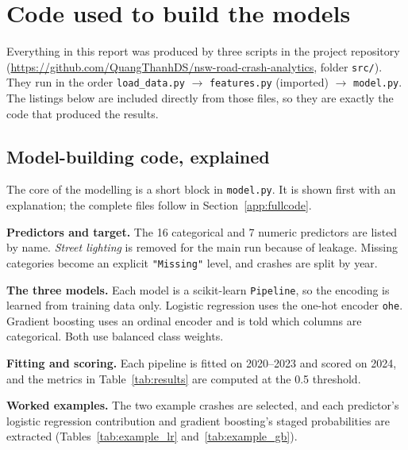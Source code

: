 \documentclass[11pt,a4paper]{article}
\begin{document}
\newpage
\section{Code used to build the models}
\label{app:code}
Everything in this report was produced by three scripts in the project repository
(\url{https://github.com/QuangThanhDS/nsw-road-crash-analytics}, folder \texttt{src/}). They run in the order
\texttt{load\_data.py} $\rightarrow$ \texttt{features.py} (imported) $\rightarrow$ \texttt{model.py}. The listings below are
included directly from those files, so they are exactly the code that produced the results.

\subsection{Model-building code, explained}
The core of the modelling is a short block in \texttt{model.py}. It is shown first with an explanation; the complete
files follow in Section~\ref{app:fullcode}.

\textbf{Predictors and target.} The 16 categorical and 7 numeric predictors are listed by name. \emph{Street lighting}
is removed for the main run because of leakage. Missing categories become an explicit \texttt{"Missing"} level, and
crashes are split by year.


\textbf{The three models.} Each model is a scikit-learn \texttt{Pipeline}, so the encoding is learned from training data
only. Logistic regression uses the one-hot encoder \texttt{ohe}. Gradient boosting uses an ordinal encoder and is told
which columns are categorical. Both use balanced class weights.


\textbf{Fitting and scoring.} Each pipeline is fitted on 2020--2023 and scored on 2024, and the metrics in
Table~\ref{tab:results} are computed at the 0.5 threshold.


\textbf{Worked examples.} The two example crashes are selected, and each predictor's logistic regression contribution
and gradient boosting's staged probabilities are extracted (Tables~\ref{tab:example_lr} and~\ref{tab:example_gb}).

\end{document}
